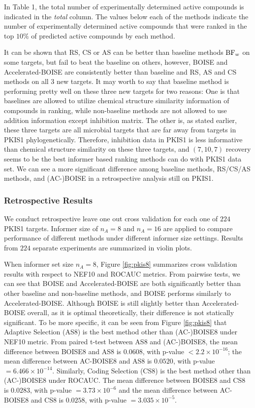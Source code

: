 \documentclass[12pt]{article}
\begin{document}
In Table 1, the total number of experimentally determined active compounds is indicated in the \textit{total} column. The values below each of the methods indicate the number of experimentally determined active compounds that were ranked in the top $10\%$ of predicted active compounds by each method. 

It can be shown that RS, CS or AS can be better than baseline methods ${\rm BF}_w$ on some targets, but fail to beat the baseline on others, however, BOISE and Accelerated-BOISE are consistently better than baseline and RS, AS and CS methods on all 3 new targets. It may worth to say that baseline method is performing pretty well on these three new targets for two reasons: One is that baselines are allowed to utilize chemical structure similarity information of compounds in ranking, while non-baseline methods are not allowed to use addition information except inhibition matrix. The other is, as stated earlier, these three targets are all microbial targets that are far away from targets in PKIS1 phylogenetically. Therefore, inhibition data in PKIS1 is less informative than chemical structure similarity on these three targets, and $(7,10,7)$ recovery seems to be the best informer based ranking methods can do with PKIS1 data set. We can see a more significant difference among baseline methods, RS/CS/AS methods, and (AC-)BOISE in a retrospective analysis still on PKIS1.

\subsubsection{Retrospective Results}
We conduct retrospective leave one out cross validation for each one of $224$ PKIS1 targets. Informer size of $n_A= 8$ and $n_A = 16$ are applied to compare performance of different methods under different informer size settings. Results from $224$ separate experiments are summarized in violin plots. 

When informer set size $n_A = 8$, Figure \ref{fig:pkis8} summarizes cross validation results with respect to NEF10 and ROCAUC metrics. From pairwise tests, we can see that BOISE and Accelerated-BOISE are both significantly better than other baseline and non-baseline methods, and BOISE performs similarly to Accelerated-BOISE. Although BOISE is still slightly better than Accelerated-BOISE overall, as it is optimal theoretically, their difference is not statically significant. 
To be more specific, it can be seen from Figure \ref{fig:pkis8} that Adaptive Selection (AS8) is the best method other than (AC-)BOISE8 under NEF10 metric. From paired t-test between AS8 and (AC-)BOISE8, the mean difference between BOISE8 and AS8 is $0.0608$, with p-value $<2.2\times 10^{-16}$; the mean difference between AC-BOISE8 and AS8 is $0.0520$, with p-value $=6.466\times 10^{-14}$. Similarly, Coding Selection (CS8) is the best method other than (AC-)BOISE8 under ROCAUC. The mean difference between BOISE8 and CS8 is $0.0283$, with p-value $=3.73\times 10^{-6}$ and the mean difference between AC-BOISE8 and CS8 is $0.0258$, with p-value $=3.035\times 10^{-5}$.
\end{document}
